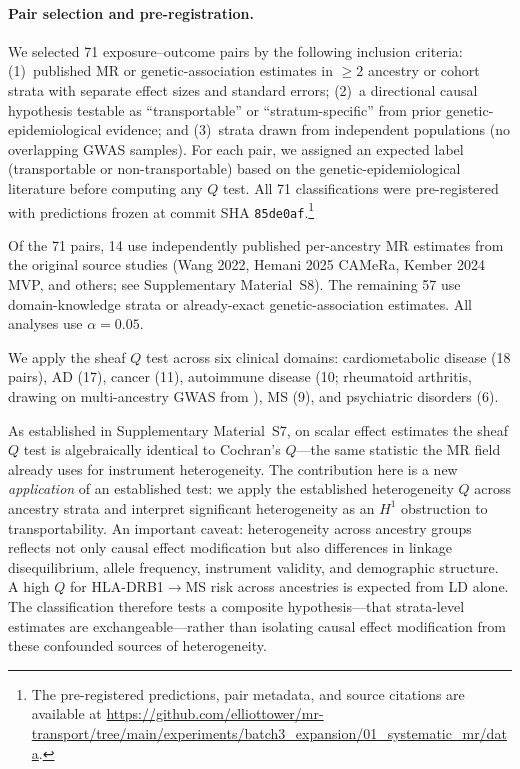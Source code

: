 \documentclass[11pt]{article}
\begin{document}
\paragraph{Pair selection and pre-registration.}
We selected 71 exposure--outcome pairs by the following inclusion criteria: (1)~published MR or genetic-association estimates in $\geq 2$ ancestry or cohort strata with separate effect sizes and standard errors; (2)~a directional causal hypothesis testable as ``transportable'' or ``stratum-specific'' from prior genetic-epidemiological evidence; and (3)~strata drawn from independent populations (no overlapping GWAS samples).
For each pair, we assigned an expected label (transportable or non-transportable) based on the genetic-epidemiological literature before computing any $Q$ test.
All 71 classifications were pre-registered with predictions frozen at commit SHA \texttt{85de0af}.\footnote{The pre-registered predictions, pair metadata, and source citations are available at \url{https://github.com/elliottower/mr-transport/tree/main/experiments/batch3_expansion/01_systematic_mr/data}.}

Of the 71 pairs, 14 use independently published per-ancestry MR estimates from the original source studies (Wang 2022, Hemani 2025 CAMeRa, Kember 2024 MVP, and others; see Supplementary Material~S8). The remaining 57 use domain-knowledge strata or already-exact genetic-association estimates. All analyses use $\alpha = 0.05$.

We apply the sheaf $Q$ test across six clinical domains: cardiometabolic disease (18 pairs), AD (17), cancer (11), autoimmune disease (10; rheumatoid arthritis, drawing on multi-ancestry GWAS from \citealt{ishigaki2022multiancestry}), MS (9), and psychiatric disorders (6).

As established in Supplementary Material~S7, on scalar effect estimates the sheaf $Q$ test is algebraically identical to Cochran's $Q$---the same statistic the MR field already uses for instrument heterogeneity.
The contribution here is a new \emph{application} of an established test: we apply the established heterogeneity $Q$ across ancestry strata and interpret significant heterogeneity as an $H^1$ obstruction to transportability.
An important caveat: heterogeneity across ancestry groups reflects not only causal effect modification but also differences in linkage disequilibrium, allele frequency, instrument validity, and demographic structure.
A high $Q$ for HLA-DRB1$\to$MS risk across ancestries is expected from LD alone.
The classification therefore tests a composite hypothesis---that strata-level estimates are exchangeable---rather than isolating causal effect modification from these confounded sources of heterogeneity.
\end{document}
